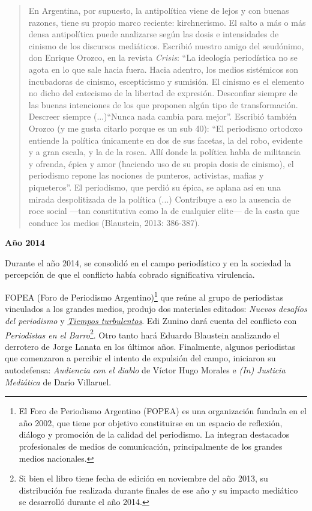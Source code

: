 {\begin{quote}
En Argentina, por supuesto, la antipolítica viene de lejos y con buenas razones, tiene su propio marco reciente: kirchnerismo. El salto a más o más densa antipolítica puede analizarse según las dosis e intensidades de cinismo de los discursos mediáticos. Escribió nuestro amigo del seudónimo, don Enrique Orozco, en la revista \emph{Crisis}: ``La ideología periodística no se agota en lo que sale hacia fuera. Hacia adentro, los medios sistémicos son incubadoras de cinismo, escepticismo y sumisión. El cinismo es el elemento no dicho del catecismo de la libertad de expresión. Desconfiar siempre de las buenas intenciones de los que proponen algún tipo de transformación. Descreer siempre (...)``Nunca nada cambia para mejor''. Escribió también Orozco (y me gusta citarlo porque es un sub 40): ``El periodismo ortodoxo entiende la política únicamente en dos de sus facetas, la del robo, evidente y a gran escala, y la de la rosca. Allí donde la política habla de militancia y ofrenda, épica y amor (haciendo uso de su propia dosis de cinismo), el periodismo repone las nociones de punteros, activistas, mafias y piqueteros''. El periodismo, que perdió su épica, se aplana así en una mirada despolitizada de la política (...) Contribuye a eso la ausencia de roce social ---tan constitutiva como la de cualquier elite--- de la casta que conduce los medios (Blaustein, 2013: 386-387).
\end{quote}

\textbf{Año 2014}

Durante el año 2014, se consolidó en el campo periodístico y en la sociedad la percepción de que el conflicto había cobrado significativa virulencia.

FOPEA (Foro de Periodismo Argentino)\footnote{El Foro de Periodismo Argentino (FOPEA) es una organización fundada en el año 2002, que tiene por objetivo constituirse en un espacio de reflexión, diálogo y promoción de la calidad del periodismo. La integran destacados profesionales de medios de comunicación, principalmente de los grandes medios nacionales.} que reúne al grupo de periodistas vinculados a los grandes medios, produjo dos materiales editados: \emph{Nuevos desafíos del periodismo} y \href{http://www.cuspide.com/9789871496990/Tiempos+Turbulentos/}{\emph{Tiempos turbulentos}}. Edi Zunino dará cuenta del conflicto con \emph{Periodistas en el Barro}\footnote{Si bien el libro tiene fecha de edición en noviembre del año 2013, su distribución fue realizada durante finales de ese año y su impacto mediático se desarrolló durante el año 2014.}. Otro tanto hará Eduardo Blaustein analizando el derrotero de Jorge Lanata en los últimos años. Finalmente, algunos periodistas que comenzaron a percibir el intento de expulsión del campo, iniciaron su autodefensa: \emph{Audiencia con el diablo} de Víctor Hugo Morales e \emph{(In) Justicia Mediática} de Darío Villaruel.

}
